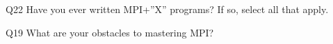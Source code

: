 \begin{description}%
\item{Q22} Have you ever written MPI+”X” programs? If so, select all that apply.%
\item{Q19} What are your obstacles to mastering MPI?%
\end{description}%
